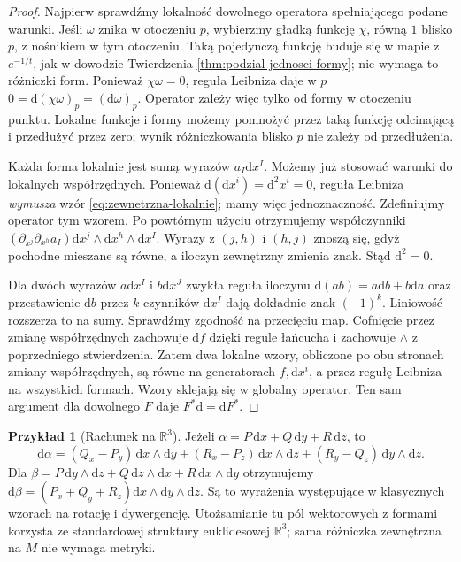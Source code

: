 \documentclass[11pt,a4paper,oneside]{report}
\newcommand{\R}{\mathbb{R}}
\newcommand{\dd}{\mathrm d}
\theoremstyle{plain}
\theoremstyle{definition}
\newtheorem{przyklad}[twierdzenie]{Przykład}
\theoremstyle{remark}
\begin{document}
\begin{proof}
Najpierw sprawdźmy lokalność dowolnego operatora spełniającego
podane warunki. Jeśli $\omega$ znika w otoczeniu $p$, wybierzmy
gładką funkcję $\chi$, równą $1$ blisko $p$, z nośnikiem
w tym otoczeniu. Taką pojedynczą funkcję buduje się w mapie
z $e^{-1/t}$, jak w dowodzie Twierdzenia
\ref{thm:podzial-jednosci-formy}; nie wymaga to różniczki form.
Ponieważ $\chi\omega=0$, reguła Leibniza daje w $p$
$0=\dd(\chi\omega)_p=(\dd\omega)_p$.
Operator zależy więc tylko od formy w otoczeniu punktu.
Lokalne funkcje i formy możemy pomnożyć przez taką funkcję
odcinającą i przedłużyć przez zero; wynik różniczkowania
blisko $p$ nie zależy od przedłużenia.

Każda forma lokalnie jest sumą wyrazów $a_I\dd x^I$.
Możemy już stosować warunki do lokalnych współrzędnych.
Ponieważ $\dd(\dd x^i)=\dd^2x^i=0$,
reguła Leibniza \emph{wymusza} wzór
\eqref{eq:zewnetrzna-lokalnie}; mamy więc jednoznaczność.
Zdefiniujmy operator tym wzorem. Po powtórnym użyciu
otrzymujemy współczynniki
$(\partial_{x^j}\partial_{x^h}a_I)
\dd x^j\wedge\dd x^h\wedge\dd x^I$.
Wyrazy z $(j,h)$ i $(h,j)$ znoszą się, gdyż pochodne
mieszane są równe, a iloczyn zewnętrzny zmienia znak.
Stąd $\dd^2=0$.

Dla dwóch wyrazów $a\dd x^I$ i $b\dd x^J$
zwykła reguła iloczynu $\dd(ab)=a\dd b+b\dd a$
oraz przestawienie $\dd b$ przez $k$ czynników
$\dd x^I$ dają dokładnie znak $(-1)^k$.
Liniowość rozszerza to na sumy.
Sprawdźmy zgodność na przecięciu map. Cofnięcie przez
zmianę współrzędnych zachowuje $\dd f$ dzięki regule
łańcucha i zachowuje $\wedge$ z poprzedniego
stwierdzenia. Zatem dwa lokalne wzory, obliczone po obu
stronach zmiany współrzędnych, są równe na generatorach
$f,\dd x^i$, a przez regułę Leibniza na wszystkich formach.
Wzory sklejają się w globalny operator. Ten sam argument
dla dowolnego $F$ daje $F^*\dd=\dd F^*$.
\end{proof}

\begin{przyklad}[Rachunek na $\R^3$]
Jeżeli $\alpha=P\,\dd x+Q\,\dd y+R\,\dd z$, to
\[
 \dd\alpha=(Q_x-P_y)\,\dd x\wedge\dd y
 +(R_x-P_z)\,\dd x\wedge\dd z
 +(R_y-Q_z)\,\dd y\wedge\dd z.
\]
Dla $\beta=P\,\dd y\wedge\dd z
+Q\,\dd z\wedge\dd x+R\,\dd x\wedge\dd y$
otrzymujemy $\dd\beta=(P_x+Q_y+R_z)
\dd x\wedge\dd y\wedge\dd z$.
Są to wyrażenia występujące w klasycznych wzorach na rotację
i dywergencję. Utożsamianie tu pól wektorowych z formami
korzysta ze standardowej struktury euklidesowej $\R^3$;
sama różniczka zewnętrzna na $M$ nie wymaga metryki.
\end{przyklad}
\end{document}
